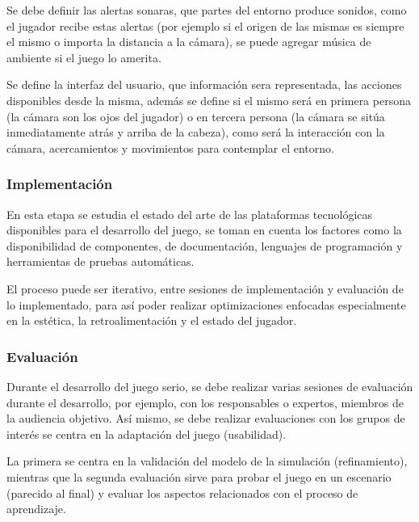 Se debe definir las alertas sonaras, que partes del entorno produce sonidos,
como el jugador recibe estas alertas (por ejemplo si el origen de las mismas es
siempre el mismo o importa la distancia a la cámara), se puede agregar música de
ambiente si el juego lo amerita.

Se define la interfaz del usuario, que información sera representada, las
acciones disponibles desde la misma, además se define si el mismo será en
primera persona (la cámara son los ojos del jugador) o en tercera persona (la
cámara se sitúa inmediatamente atrás y arriba de la cabeza), como será la
interacción con la cámara, acercamientos y movimientos para contemplar el
entorno.

\subsubsection{Implementación} 

En esta etapa se estudia el estado del arte de las plataformas tecnológicas
disponibles para el desarrollo del juego, se toman en cuenta los factores como
la disponibilidad de componentes, de documentación, lenguajes de programación y
herramientas de pruebas automáticas.

El proceso puede ser iterativo, entre sesiones de implementación y evaluación de
lo implementado, para así poder realizar optimizaciones enfocadas especialmente
en la estética, la retroalimentación y el estado del jugador.

\subsubsection{Evaluación} 

Durante el desarrollo del juego serio, se debe realizar varias sesiones de
evaluación durante el desarrollo, por ejemplo, con los responsables o expertos,
miembros de la audiencia objetivo. Así mismo, se debe realizar evaluaciones con
los grupos de interés se centra en la adaptación del juego (usabilidad). 

La primera se centra en la validación del modelo de la simulación
(refinamiento), mientras que la segunda evaluación sirve para probar el juego en
un escenario (parecido al final) y evaluar los aspectos relacionados con el
proceso de aprendizaje.

